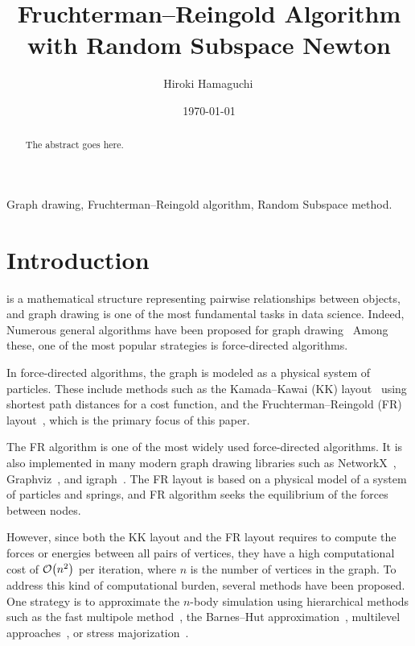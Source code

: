 \documentclass[dvipdfmx,journal]{IEEEtran}
\begin{document}
\title{Fruchterman--Reingold Algorithm with Random Subspace Newton}
\author{Hiroki Hamaguchi\,}
\date{\today}
\maketitle

\begin{abstract}
  The abstract goes here.
  \lipsum[1]
\end{abstract}

\begin{IEEEkeywords}
  Graph drawing, Fruchterman--Reingold algorithm, Random Subspace method.
\end{IEEEkeywords}

\section{Introduction}


 is a mathematical structure representing pairwise relationships between objects, and graph drawing is one of the most fundamental tasks in data science. Indeed, Numerous general algorithms have been proposed for graph drawing~\cite{tutteHowDrawGraph1963,chrobakLineartimeAlgorithmDrawing1995,sugiyamaMethodsVisualUnderstanding1981,ghassemitoosiSimulatedAnnealingPreProcessing2016}
Among these, one of the most popular strategies is force-directed algorithms.

In force-directed algorithms, the graph is modeled as a physical system of particles. These include methods such as the Kamada--Kawai (KK) layout~\cite{kamadaAlgorithmDrawingGeneral1989} using shortest path distances for a cost function, and the Fruchterman--Reingold (FR) layout~\cite{fruchtermanGraphDrawingForcedirected1991}, which is the primary focus of this paper.

The FR algorithm is one of the most widely used force-directed algorithms. It is also implemented in many modern graph drawing libraries such as NetworkX~\cite{osti_960616}, Graphviz~\cite{ellsonGraphvizOpenSource2002}, and igraph~\cite{csardiIgraphSoftwarePackage2006}. The FR layout is based on a physical model of a system of particles and springs, and FR algorithm seeks the equilibrium of the forces between nodes.

However, since both the KK layout and the FR layout requires to compute the forces or energies between all pairs of vertices, they have a high computational cost of $\order{n^2}$ per iteration, where $n$ is the number of vertices in the graph. To address this kind of computational burden, several methods have been proposed. One strategy is to approximate the $n$-body simulation using hierarchical methods such as the fast multipole method~\cite{greengardFastAlgorithmParticle1987}, the Barnes--Hut approximation~\cite{barnesHierarchicalLogForcecalculation1986}, multilevel approaches~\cite{Hu2006EfficientHF}, or stress majorization~\cite{gansnerGraphDrawingStress2005}.
\end{document}
